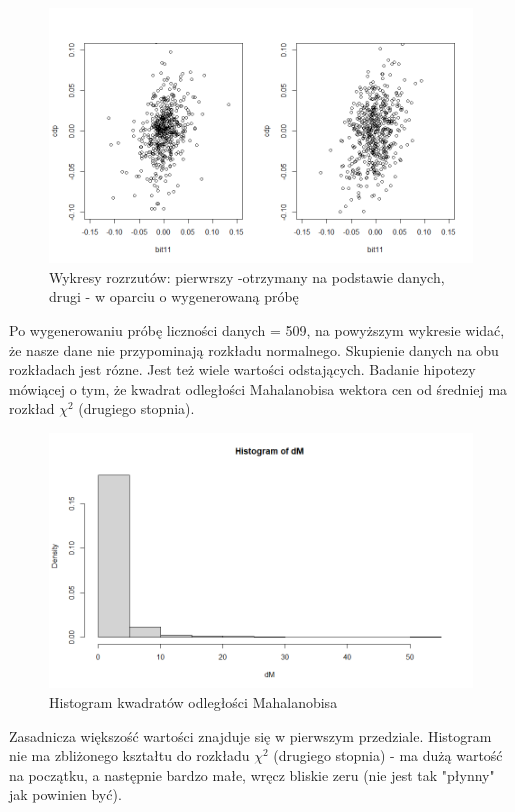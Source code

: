 \documentclass[a4paper,11pt]{article}
\def\\{\hfill\break}
\begin{document}
\begin{figure}[H]
    \includegraphics[width=13cm]{Wykresy/QQploty.png}
    \caption{Wykresy rozrzutów: pierwrszy -otrzymany na podstawie danych, drugi - w oparciu o wygenerowaną próbę}
    \label{fig:mlp}
\end{figure}
Po wygenerowaniu próbę liczności danych = 509, na powyższym wykresie widać, że nasze dane nie przypominają rozkładu normalnego. Skupienie danych na obu rozkładach jest rózne. Jest też wiele wartości odstających.
\\ \\
\newpage
Badanie hipotezy mówiącej o tym, że kwadrat odległości Mahalanobisa wektora cen od średniej ma rozkład $\chi^2$ (drugiego stopnia).
\begin{figure}[H]
    \includegraphics[width=13cm]{Wykresy/Histogram_Mahalanobis.png}
    \caption{Histogram kwadratów odległości Mahalanobisa}
    \label{fig:mlp}
\end{figure}
Zasadnicza większość wartości znajduje się w pierwszym przedziale. Histogram nie ma zbliżonego kształtu do rozkładu $\chi^2$ (drugiego stopnia) -  ma dużą wartość na początku, a następnie bardzo małe, wręcz bliskie zeru (nie jest tak "płynny" jak powinien być).
\end{document}
